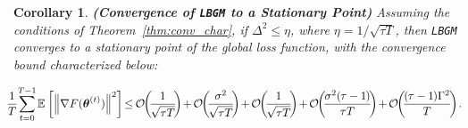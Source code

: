 \documentclass{article}
\newtheorem{corollary}{Corollary}
\newcommand{\E}[2]{\mathbb{E}_{#2}\left[#1\right]}
\renewcommand{\vec}[3]{\boldsymbol{#1}_{#2}^{#3}}
\newcommand{\norm}[2]{\left\Vert#1\right\Vert_{#2}}
\newcommand{\aligneqn}[1]{{\begin{align}#1\end{align}}}
\newcommand{\sbigo}[1]{\mathcal{O}\hspace{-1mm}\left( #1 \right)}
\newcommand{\algName}{{\tt LBGM}}
\begin{document}
\vspace{1mm}
\begin{corollary}
\label{corr:stationary_conv}
 \textbf{(Convergence of {\algName} to a Stationary Point)} 
Assuming the conditions of Theorem~\ref{thm:conv_char}, if $\Delta^2 \leq \eta$, where $\eta=1/\sqrt{\tau T}$, then {\algName} converges to a stationary point of the global loss function, with the convergence bound characterized below:
\vspace{-6mm}

{\small
\aligneqn{
\hspace{-2mm}
    \hspace{-0.5mm}\frac{1}{T} \hspace{-0.5mm} \sum_{t=0}^{T-1} \hspace{-0.2mm} \E{\norm{\nabla F(\vec{\theta}{}{(t)})}{}^2}{} \hspace{-0.5mm} \leq \hspace{-0.3mm} \sbigo{\hspace{-0.3mm}\hspace{-0.5mm}\frac{1}{\sqrt{\tau T}}\hspace{-0.5mm}\hspace{-0.3mm}} \hspace{-0.5mm} + \hspace{-0.3mm} \sbigo{\hspace{-0.3mm}\hspace{-0.5mm}\frac{\sigma^2}{\sqrt{\tau T}}\hspace{-0.5mm}\hspace{-0.3mm}} \hspace{-0.5mm}+\hspace{-0.3mm} \sbigo{\hspace{-0.3mm}\hspace{-0.5mm}\frac{1}{\sqrt{\tau T}}\hspace{-0.5mm}\hspace{-0.3mm}} \hspace{-0.5mm}+\hspace{-0.3mm} \sbigo{\hspace{-0.3mm}\hspace{-0.5mm}\frac{\sigma^2(\hspace{-0.2mm}\tau-1\hspace{-0.2mm})}{\tau T}\hspace{-0.5mm}\hspace{-0.3mm}} \hspace{-0.5mm}+\hspace{-0.3mm} \sbigo{\hspace{-0.3mm}\hspace{-0.5mm}\frac{ (\hspace{-0.2mm}\tau-1\hspace{-0.2mm})\Gamma^2}{ T}\hspace{-0.3mm}\hspace{-0.3mm}}\hspace{-0.3mm}.
}\hspace{-6mm}
}
\end{corollary}
\end{document}
